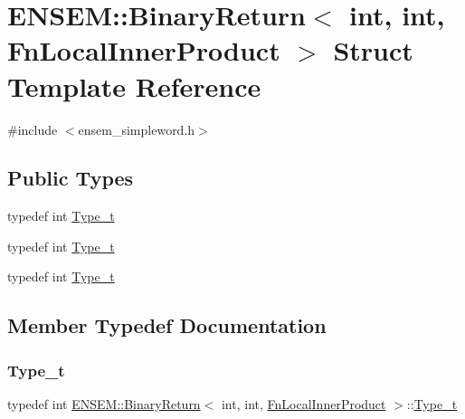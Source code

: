 \hypertarget{structENSEM_1_1BinaryReturn_3_01int_00_01int_00_01FnLocalInnerProduct_01_4}{}\section{E\+N\+S\+EM\+:\+:Binary\+Return$<$ int, int, Fn\+Local\+Inner\+Product $>$ Struct Template Reference}
\label{structENSEM_1_1BinaryReturn_3_01int_00_01int_00_01FnLocalInnerProduct_01_4}


{\ttfamily \#include $<$ensem\+\_\+simpleword.\+h$>$}

\subsection*{Public Types}
\begin{DoxyCompactItemize}
\item 
typedef int \mbox{\hyperlink{structENSEM_1_1BinaryReturn_3_01int_00_01int_00_01FnLocalInnerProduct_01_4_abc5bd3e21df0f42ad6b223a7b59549ba}{Type\+\_\+t}}
\item 
typedef int \mbox{\hyperlink{structENSEM_1_1BinaryReturn_3_01int_00_01int_00_01FnLocalInnerProduct_01_4_abc5bd3e21df0f42ad6b223a7b59549ba}{Type\+\_\+t}}
\item 
typedef int \mbox{\hyperlink{structENSEM_1_1BinaryReturn_3_01int_00_01int_00_01FnLocalInnerProduct_01_4_abc5bd3e21df0f42ad6b223a7b59549ba}{Type\+\_\+t}}
\end{DoxyCompactItemize}


\subsection{Member Typedef Documentation}
\mbox{\label{structENSEM_1_1BinaryReturn_3_01int_00_01int_00_01FnLocalInnerProduct_01_4_abc5bd3e21df0f42ad6b223a7b59549ba}} 
\subsubsection{\texorpdfstring{Type\_t}{Type\_t}\hspace{0.1cm}{\footnotesize\ttfamily [1/3]}}
{\footnotesize\ttfamily typedef int \mbox{\hyperlink{structENSEM_1_1BinaryReturn}{E\+N\+S\+E\+M\+::\+Binary\+Return}}$<$ int, int, \mbox{\hyperlink{structENSEM_1_1FnLocalInnerProduct}{Fn\+Local\+Inner\+Product}} $>$\+::\mbox{\hyperlink{structENSEM_1_1BinaryReturn_3_01int_00_01int_00_01FnLocalInnerProduct_01_4_abc5bd3e21df0f42ad6b223a7b59549ba}{Type\+\_\+t}}}

